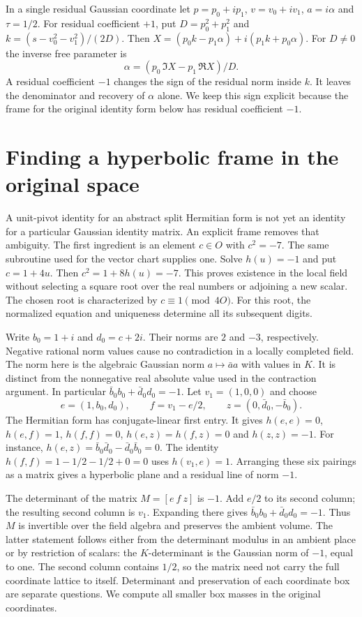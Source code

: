 \documentclass[12pt,letterpaper]{article}
\begin{document}
In a single residual Gaussian coordinate let $p=p_0+ip_1$, $v=v_0+iv_1$, $a=i\alpha$ and $\tau=1/2$. For residual coefficient $+1$, put $D=p_0^2+p_1^2$ and $k=(s-v_0^2-v_1^2)/(2D)$. Then $X=(p_0k-p_1\alpha)+i(p_1k+p_0\alpha)$. For $D\ne0$ the inverse free parameter is
\[
        \alpha=(p_0\,\Im X-p_1\,\Re X)/D .
\]
A residual coefficient $-1$ changes the sign of the residual norm inside $k$. It leaves the denominator and recovery of $\alpha$ alone. We keep this sign explicit because the frame for the original identity form below has residual coefficient $-1$.

\section{Finding a hyperbolic frame in the original space}
A unit-pivot identity for an abstract split Hermitian form is not yet an identity for a particular Gaussian identity matrix. An explicit frame removes that ambiguity. The first ingredient is an element $c\in O$ with $c^2=-7$. The same subroutine used for the vector chart supplies one. Solve $h(u)=-1$ and put $c=1+4u$. Then $c^2=1+8h(u)=-7$. This proves existence in the local field without selecting a square root over the real numbers or adjoining a new scalar. The chosen root is characterized by $c\equiv1\pmod{4O}$. For this root, the normalized equation and uniqueness determine all its subsequent digits.

Write $b_0=1+i$ and $d_0=c+2i$. Their norms are $2$ and $-3$, respectively. Negative rational norm values cause no contradiction in a locally completed field. The norm here is the algebraic Gaussian norm $a\mapsto\bar a a$ with values in $K$. It is distinct from the nonnegative real absolute value used in the contraction argument. In particular $\bar b_0 b_0+\bar d_0d_0=-1$. Let $v_1=(1,0,0)$ and choose
\[
  e=(1,b_0,d_0),\qquad f=v_1-e/2,\qquad
  z=(0,\bar d_0,-\bar b_0).
\]
The Hermitian form has conjugate-linear first entry. It gives $h(e,e)=0$, $h(e,f)=1$, $h(f,f)=0$, $h(e,z)=h(f,z)=0$ and $h(z,z)=-1$. For instance, $h(e,z)=\bar b_0\bar d_0-\bar d_0\bar b_0=0$. The identity $h(f,f)=1-1/2-1/2+0=0$ uses $h(v_1,e)=1$. Arranging these six pairings as a matrix gives a hyperbolic plane and a residual line of norm $-1$.

The determinant of the matrix $M=[e\ f\ z]$ is $-1$. Add $e/2$ to its second column; the resulting second column is $v_1$. Expanding there gives $\bar b_0 b_0+\bar d_0 d_0=-1$. Thus $M$ is invertible over the field algebra and preserves the ambient volume. The latter statement follows either from the determinant modulus in an ambient place or by restriction of scalars: the $K$-determinant is the Gaussian norm of $-1$, equal to one. The second column contains $1/2$, so the matrix need not carry the full coordinate lattice to itself. Determinant and preservation of each coordinate box are separate questions. We compute all smaller box masses in the original coordinates.
\end{document}
